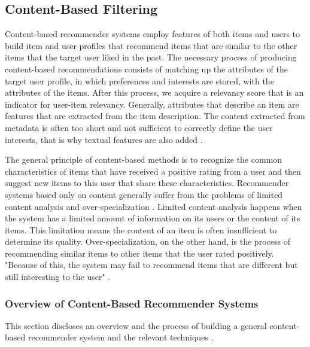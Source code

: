 
\subsection{Content-Based Filtering}\label{section:content_based_filtering}

Content-based recommender systems employ features of both items and users to build item and user profiles that recommend items that are similar to the other items that the target user liked in the past. The necessary process of producing content-based recommendations consists of matching up the attributes of the target user profile, in which preferences and interests are stored, with the attributes of the items. After this process, we acquire a relevancy score that is an indicator for user-item relevancy. Generally, attributes that describe an item are features that are extracted from the item description. The content extracted from metadata is often too short and not sufficient to correctly define the user interests, that is why textual features are also added \cite{de2015semantics}.

The general principle of content-based methods is to recognize the common characteristics of items that have received a positive rating from a user and then suggest new items to this user that share these characteristics. Recommender systems based only on content generally suffer from the problems of limited content analysis and over-specialization \cite{shardanand1995social}. Limited content analysis happens when the system has a limited amount of information on its users or the content of its items. This limitation means the content of an item is often insufficient to determine its quality. Over-specialization, on the other hand, is the process of recommending similar items to other items that the user rated positively. "Because of this, the system may fail to recommend items that are different but still interesting to the user" \cite{desrosiers2011comprehensive}.

\subsubsection{Overview of Content-Based Recommender Systems}

This section discloses an overview and the process of building a general content-based recommender system and the relevant techniques \cite{de2015semantics}.

